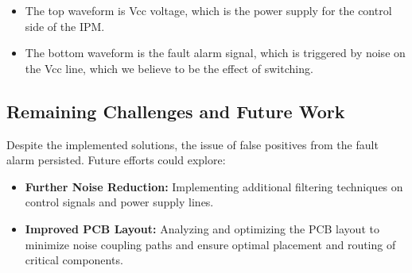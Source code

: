 \begin{itemize}
	\item The top waveform is Vcc voltage, which is the power supply for the control side of the IPM.
	\item The bottom waveform is the fault alarm signal, which is triggered by noise on the Vcc line, which we believe to be the effect of switching.
\end{itemize}


\subsection*{Remaining Challenges and Future Work}

Despite the implemented solutions, the issue of false positives from the fault alarm persisted. Future efforts could explore:

\begin{itemize}
	\item \textbf{Further Noise Reduction:} Implementing additional filtering techniques on control signals and power supply lines.
	\item \textbf{Improved PCB Layout:} Analyzing and optimizing the PCB layout to minimize noise coupling paths and ensure optimal placement and routing of critical components.
\end{itemize}



\newpage